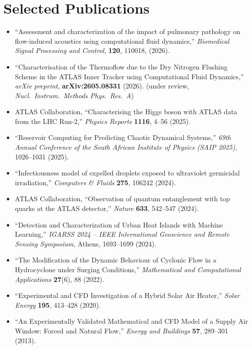 \documentclass[11pt, a4paper]{article}
\begin{document}
\section{Selected Publications}
\begin{itemize}
  \item ``Assessment and characterization of the impact of pulmonary pathology on flow-induced acoustics using computational fluid dynamics,'' \textit{Biomedical Signal Processing and Control}, \textbf{120}, 110018, (2026).
  \item ``Characterisation of the Thermoflow due to the Dry Nitrogen Flushing Scheme in the ATLAS Inner Tracker using Computational Fluid Dynamics,'' \textit{arXiv preprint}, \textbf{arXiv:2605.08331} (2026). (under review, \textit{Nucl.\ Instrum.\ Methods Phys.\ Res.\ A})
  \item ATLAS Collaboration, ``Characterising the Higgs boson with ATLAS data from the LHC Run-2,'' \textit{Physics Reports} \textbf{1116}, 4--56 (2025).
  \item ``Reservoir Computing for Predicting Chaotic Dynamical Systems,'' \textit{69th Annual Conference of the South African Institute of Physics (SAIP 2025)}, 1026--1031 (2025).
  \item ``Infectiousness model of expelled droplets exposed to ultraviolet germicidal irradiation,'' \textit{Computers \& Fluids} \textbf{275}, 106242 (2024).
  \item ATLAS Collaboration, ``Observation of quantum entanglement with top quarks at the ATLAS detector,'' \textit{Nature} \textbf{633}, 542--547 (2024).
  \item ``Detection and Characterization of Urban Heat Islands with Machine Learning,'' \textit{IGARSS 2024 -- IEEE International Geoscience and Remote Sensing Symposium}, Athens, 1693--1699 (2024).
  \item ``The Modification of the Dynamic Behaviour of Cyclonic Flow in a Hydrocyclone under Surging Conditions,'' \textit{Mathematical and Computational Applications} \textbf{27}(6), 88 (2022).
  \item ``Experimental and CFD Investigation of a Hybrid Solar Air Heater,'' \textit{Solar Energy} \textbf{195}, 413--428 (2020).
  \item ``An Experimentally Validated Mathematical and CFD Model of a Supply Air Window: Forced and Natural Flow,'' \textit{Energy and Buildings} \textbf{57}, 289--301 (2013).
\end{itemize}
\end{document}
